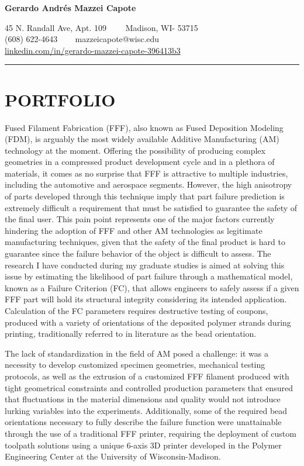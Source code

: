 \documentclass[11pt,letterpaper]{article}
\begin{document}
\begin{center}
	{\LARGE \textbf{Gerardo Andrés Mazzei Capote}}

	45 N. Randall Ave, Apt. 109\ \ \textbullet
	\ \ Madison, WI- 53715
	\\
	(608) 622-4643 \ \textbullet
	\ \ mazzeicapote@wisc.edu\\
	\href{https://www.linkedin.com/in/gerardo-mazzei-capote-396413b3}{linkedin.com/in/gerardo-mazzei-capote-396413b3}
	
\end{center}
\vspace{-0.5em}
\hrule
\vspace{0.4em}
\vspace{-1em}

\section*{PORTFOLIO}

Fused Filament Fabrication (FFF), also known as Fused Deposition Modeling (FDM), is arguably the most widely available Additive Manufacturing (AM) technology at the moment. Offering the possibility of producing complex geometries in a compressed product development cycle and in a plethora of materials, it comes as no surprise that FFF is attractive to multiple industries, including the automotive and aerospace segments. However, the high anisotropy of parts developed through this technique imply that part failure prediction is extremely difficult \textemdash a requirement that must be satisfied to guarantee the safety of the final user. This pain point represents one of the major factors currently hindering the adoption of FFF and other AM technologies as legitimate manufacturing techniques, given that the safety of the final product is hard to guarantee since the failure behavior of the object is difficult to assess. The research I have conducted during my graduate studies is aimed at solving this issue by estimating the likelihood of part failure through a mathematical model, known as a Failure Criterion (FC), that allows engineers to safely assess if a given FFF part will hold its structural integrity considering its intended application. Calculation of the FC parameters requires destructive testing of coupons, produced with a variety of orientations of the deposited polymer strands during printing, traditionally referred to in literature as the bead orientation.

The lack of standardization in the field of AM posed a challenge: it was a necessity to develop customized specimen geometries, mechanical testing protocols, as well as the extrusion of a customized FFF filament produced with tight geometrical constraints and controlled production parameters that ensured that fluctuations in the material dimensions and quality would not introduce lurking variables into the experiments. Additionally, some of the required bead orientations necessary to fully describe the failure function were unattainable through the use of a traditional FFF printer, requiring the deployment of custom toolpath solutions using a unique 6-axis 3D printer developed in the Polymer Engineering Center at the University of Wisconsin-Madison.
\end{document}

